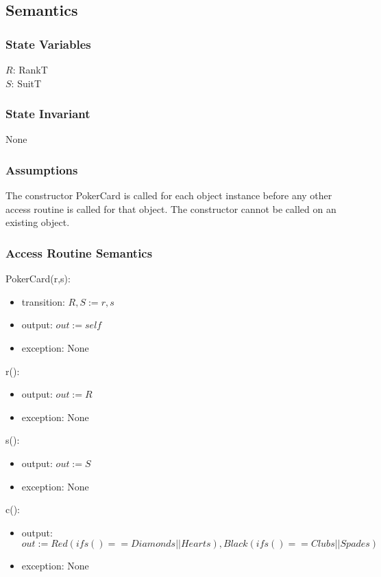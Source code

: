 \documentclass[12pt]{article}
\begin{document}
\subsection* {Semantics}

\subsubsection* {State Variables}

$R$: RankT\\
$S$: SuitT

\subsubsection* {State Invariant}

None

\subsubsection* {Assumptions}

The constructor PokerCard is called for each object instance before any other
access routine is called for that object.  The constructor cannot be called on
an existing object.

\subsubsection* {Access Routine Semantics}

PokerCard(r,s):
\begin{itemize}
\item transition: $R, S := r, s$
\item output: $out := \mathit{self}$
\item exception: None
\end{itemize}

\noindent r():
\begin{itemize}
\item output: $out := R$
\item exception: None
\end{itemize}

\noindent s():
\begin{itemize}
\item output: $out := S$
\item exception: None
\end{itemize}

\noindent c():
\begin{itemize}
\item output: $out := Red(if s()==Diamonds||Hearts), Black(if s()==Clubs||Spades)$
\item exception: None
\end{itemize}
\end{document}
